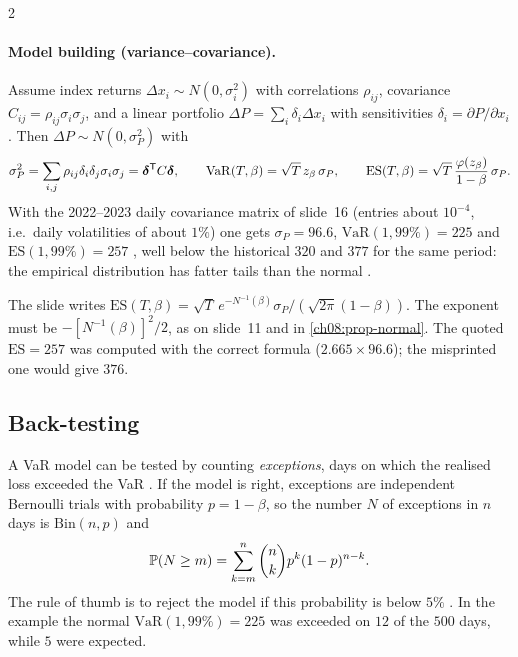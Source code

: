 \begin{paracol}{2}
\paragraph{Model building (variance--covariance).} Assume index returns $\Delta x_i\sim N(0,\sigma_i^2)$ with
correlations $\rho_{ij}$, covariance $C_{ij}=\rho_{ij}\sigma_i\sigma_j$, and a linear portfolio
$\Delta P=\sum_i\delta_i\Delta x_i$ with sensitivities $\delta_i=\partial P/\partial x_i$ . Then
$\Delta P\sim N(0,\sigma_P^2)$ with
\[
  \sigma_P^2=\sum_{i,j}\rho_{ij}\delta_i\delta_j\sigma_i\sigma_j=\bm\delta^{\mathsf T} C\bm\delta,\qquad
  \mathrm{VaR}(T,\beta)=\sqrt T\,z_\beta\,\sigma_P,\qquad
  \mathrm{ES}(T,\beta)=\sqrt T\,\frac{\varphi(z_\beta)}{1-\beta}\,\sigma_P .
\]
With the 2022--2023 daily covariance matrix of slide~16 (entries about $10^{-4}$, i.e.\ daily volatilities of
about $1\%$) one gets $\sigma_P=96.6$, $\mathrm{VaR}(1,99\%)=225$ and $\mathrm{ES}(1,99\%)=257$ ,
well below the historical $320$ and $377$ for the same period: the empirical distribution has fatter tails than the
normal .

\begin{coursenote}
The slide writes $\mathrm{ES}(T,\beta)=\sqrt T\,e^{-N^{-1}(\beta)}\sigma_P/(\sqrt{2\pi}(1-\beta))$. The exponent
must be $-[N^{-1}(\beta)]^2/2$, as on slide~11 and in \cref{ch08:prop-normal}. The quoted $\mathrm{ES}=257$ was
computed with the correct formula ($2.665\times96.6$); the misprinted one would give $376$.
\end{coursenote}

\subsection{Back-testing}
A VaR model can be tested by counting \emph{exceptions}, days on which the realised loss exceeded the VaR
. If the model is right, exceptions are independent Bernoulli trials with probability
$p=1-\beta$, so the number $N$ of exceptions in $n$ days is $\mathrm{Bin}(n,p)$ and
\[
  \mathbb{P}(N\ge m)=\sum_{k=m}^n\binom nk p^k(1-p)^{n-k}.
\]
The rule of thumb is to reject the model if this probability is below $5\%$ . In the example the
normal $\mathrm{VaR}(1,99\%)=225$ was exceeded on $12$ of the $500$ days, while $5$ were expected.


\end{paracol}
